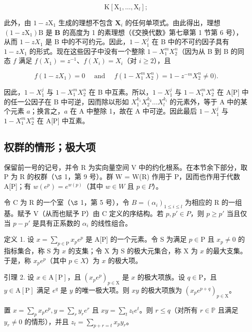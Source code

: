 \[
\mathrm{K} \left[ \mathrm{X} _ {1}, \dots , \mathrm{X} _ {l} \right];
\]

此外，由 \(1 - z\mathrm{X}_1\) 生成的理想不包含 \(\mathbf{X}_i\) 的任何单项式。由此得出，理想 \((1 - z\mathrm{X}_1)\mathrm{B}\) 是 \(\mathbf{B}\) 的高度为 1 的素理想（《交换代数》第七章第 1 节第 6 号），从而 \(1 - zX_{1}\) 是 B 中的不可约元。因此，\(1 - X_{1}^{j}\) 在 B 中的不可约因子具有 \(1 - zX_{1}\) 的形式。现在这些因子中没有一个整除 \(1 - X_{1}^{m}X_{2}^{n}\)（因为从 B 到 B 的同态 \(f\) 满足 \(f(X_{1}) = z^{-1}\)、\(f(X_{i}) = X_{i}\)（对 \(i \geqslant 2\)），且

\[
f (1 - z X _ {1}) = 0 \quad \text { and } \quad f (1 - X _ {1} ^ {m} X _ {2} ^ {n}) = 1 - z ^ {- m} X _ {2} ^ {n} \neq 0).
\]

因此，\(1 - X_1^j\) 与 \(1 - X_1^m X_2^n\) 在 B 中互素。所以，\(1 - X_1^j\) 与 \(1 - X_1^m X_2^n\) 在 A{[}P{]} 中的任一公因子在 B 中可逆，因而除以形如 \(X_1^{k_1}X_2^{k_2}\ldots X_l^{k_l}\) 的元素外，等于 A 中的某个元素 \(a\)；换言之，\(a\) 在 A 中整除 1，故在 A 中可逆。因此最后 \(1 - X_1^j\) 与 \(1 - X_1^m X_2^n\) 在 A{[}P{]} 中互素。

\subsection{权群的情形；极大项}

保留前一号的记号，并令 R 为实向量空间 V 中的约化根系。在本节余下部分，取 P 为 R 的权群（\(\S\) 1，第 9 号）。群 W = W(R) 作用于 P，因而也作用于代数 A{[}P{]}；有 \(w(e^{p}) = e^{w(p)}\)（其中 \(w \in W\) 且 \(p \in P\)）。

令 C 为 R 的一个室（\(\S\) 1，第 5 号），令 \(B = (\alpha_{i})_{1 \leqslant i \leqslant l}\) 为相应的 R 的一组基。赋予 V（从而也赋予 P）由 C 定义的序结构。若 \(p, p' \in P\)，则 \(p \geqslant p'\) 当且仅当 \(p - p'\) 是具有正系数的 \(\alpha_{i}\) 的线性组合。

定义 1. 设 \(x = \sum_{p \in \mathrm{P}} x_p e^p\) 是 A{[}P{]} 的一个元素。令 S 为满足 \(p \in \mathrm{P}\) 且 \(x_p \neq 0\) 的指标集合，称 S 为 \(x\) 的支集；令 X 为 S 的极大元集合，称 X 为 \(x\) 的最大支集。于是，称 \(x_p e^p\)（其中 \(p \in X\)）为 \(x\) 的极大项。

引理 2. 设 \(x \in \mathrm{A}[\mathrm{P}]\)，且 \((x_{p}e^{p})_{p \in \mathrm{X}}\) 是 \(x\) 的极大项族。设 \(q \in \mathrm{P}\)，且 \(y \in \mathrm{A}[\mathrm{P}]\) 满足 \(e^{q}\) 是 \(y\) 的唯一极大项。则 \(xy\) 的极大项族为 \((x_{p}e^{p + q})_{p \in \mathrm{X}}\)。

置 \(x = \sum_{p} x_{p} e^{p}, y = \sum_{r} y_{r} e^{r}\) 且 \(xy = \sum_{t} z_{t} e^{t}\)。则 \(r \leqslant q\)（对所有 \(r \in \mathbb{P}\) 且满足 \(y_{r} \neq 0\) 的情形），并且 \(z_{t} = \sum_{p + r = t} x_{p} y_{r}\)。

